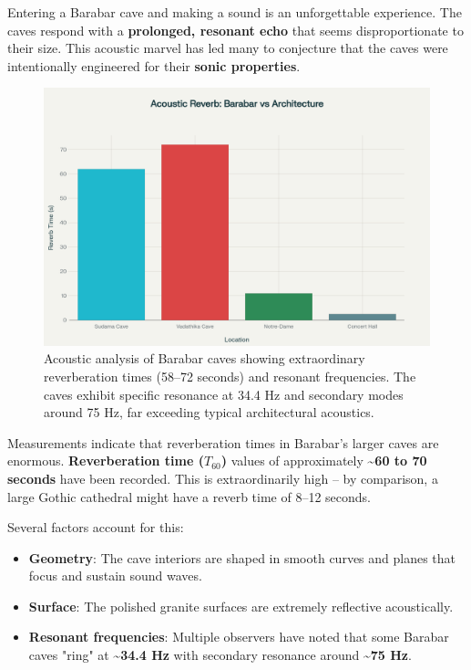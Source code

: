 \documentclass[11pt]{article}
\begin{document}
Entering a Barabar cave and making a sound is an unforgettable experience. The caves respond with a \textbf{prolonged, resonant echo} that seems disproportionate to their size. This acoustic marvel has led many to conjecture that the caves were intentionally engineered for their \textbf{sonic properties}.

\begin{figure}[H]
\centering
\includegraphics[width=0.8\linewidth]{.github/acoustic_reverberation_chart.png}
\caption{Acoustic analysis of Barabar caves showing extraordinary reverberation times (58--72 seconds) and resonant frequencies. The caves exhibit specific resonance at 34.4 Hz and secondary modes around 75 Hz, far exceeding typical architectural acoustics.}
\label{fig:acoustic_analysis}
\end{figure}

Measurements indicate that reverberation times in Barabar's larger caves are enormous. \textbf{Reverberation time ($T_{60}$)} values of approximately \textbf{\textasciitilde 60 to 70 seconds} have been recorded. This is extraordinarily high -- by comparison, a large Gothic cathedral might have a reverb time of 8--12 seconds.

Several factors account for this:

\begin{itemize}
\item \textbf{Geometry}: The cave interiors are shaped in smooth curves and planes that focus and sustain sound waves.
\item \textbf{Surface}: The polished granite surfaces are extremely reflective acoustically.
\item \textbf{Resonant frequencies}: Multiple observers have noted that some Barabar caves "ring" at \textbf{\textasciitilde 34.4 Hz} with secondary resonance around \textbf{\textasciitilde 75 Hz}.
\end{itemize}
\end{document}
